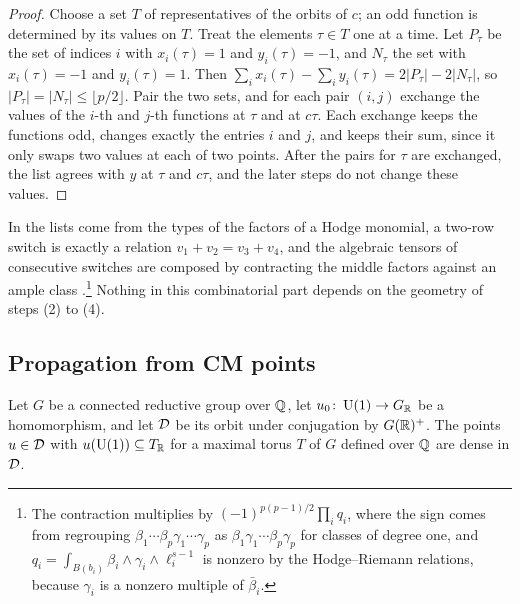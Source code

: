 \begin{proof}
Choose a set $T$ of representatives of the orbits of $c$; an odd function is
determined by its values on $T$. Treat the elements $\tau\in T$ one at a
time. Let $P_{\tau}$ be the set of indices $i$ with $x_{i}(\tau)=1$ and
$y_{i}(\tau)=-1$, and $N_{\tau}$ the set with $x_{i}(\tau)=-1$ and
$y_{i}(\tau)=1$. Then $\sum_{i}x_{i}(\tau)-\sum_{i}y_{i}(\tau)=2|P_{\tau}|-
2|N_{\tau}|$, so $|P_{\tau}|=|N_{\tau}|\le\lfloor p/2\rfloor$. Pair the two
sets, and for each pair $(i,j)$ exchange the values of the $i$-th and $j$-th
functions at $\tau$ and at $c\tau$. Each exchange keeps the functions odd,
changes exactly the entries $i$ and $j$, and keeps their sum, since it only
swaps two values at each of two points. After the pairs for $\tau$ are
exchanged, the list agrees with $y$ at $\tau$ and $c\tau$, and the later
steps do not change these values.
\end{proof}

In \cite{OAI26} the lists come from the types of the factors of a Hodge
monomial, a two-row switch is exactly a relation $v_{1}+v_{2}=v_{3}+v_{4}$,
and the algebraic tensors of consecutive switches are composed by
contracting the middle factors against an ample class
\cite[(2.6)]{OAI26}.\footnote{The contraction multiplies by
$(-1)^{p(p-1)/2}\prod_{i}q_{i}$, where the sign comes from regrouping
$\beta_{1}\cdots\beta_{p}\gamma_{1}\cdots\gamma_{p}$ as
$\beta_{1}\gamma_{1}\cdots\beta_{p}\gamma_{p}$ for classes of degree one, and
$q_{i}=\int_{B(b_{i})}\beta_{i}\wedge\gamma_{i}\wedge\ell_{i}^{s-1}$ is
nonzero by the Hodge--Riemann relations, because $\gamma_{i}$ is a nonzero
multiple of $\bar\beta_{i}$.} Nothing in this combinatorial part depends on
the geometry of steps (2) to (4).

\subsection{Propagation from CM points}

\begin{lemma}\label{lem:cmdense}
Let $G$ be a connected reductive group over $\mathbb{Q}$, let
$u_{0}\colon\operatorname{U}(1)\to G_{\mathbb{R}}$ be a homomorphism, and let $\mathcal{D}$ be its orbit
under conjugation by $G(\mathbb{R})^{+}$. The points $u\in\mathcal{D}$ with
$u(\operatorname{U}(1))\subseteq T_{\mathbb{R}}$ for a maximal torus $T$ of $G$ defined over
$\mathbb{Q}$ are dense in $\mathcal{D}$.
\end{lemma}

